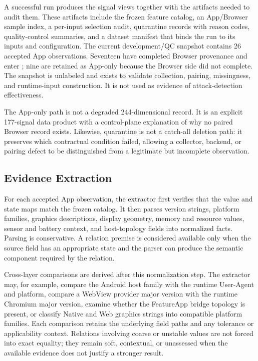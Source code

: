 A successful run produces the signal views together with the artifacts needed to audit them. These artifacts include the frozen feature catalog, an App/Browser sample index, a per-input selection audit, quarantine records with reason codes, quality-control summaries, and a dataset manifest that binds the run to its inputs and configuration. The current development/QC snapshot contains 26 accepted App observations. Seventeen have completed Browser provenance and enter \pairedfp; nine are retained as App-only because the Browser side did not complete. The snapshot is unlabeled and exists to validate collection, pairing, missingness, and runtime-input construction. It is not used as evidence of attack-detection effectiveness.

The App-only path is not a degraded 244-dimensional record. It is an explicit 177-signal data product with a control-plane explanation of why no paired Browser record exists. Likewise, quarantine is not a catch-all deletion path: it preserves which contractual condition failed, allowing a collector, backend, or pairing defect to be distinguished from a legitimate but incomplete observation.

\subsection{Evidence Extraction}

For each accepted App observation, the extractor first verifies that the value and state maps match the frozen catalog. It then parses version strings, platform families, graphics descriptions, display geometry, memory and resource values, sensor and battery context, and host-topology fields into normalized facts. Parsing is conservative. A relation premise is considered available only when the source field has an appropriate state and the parser can produce the semantic component required by the relation.

Cross-layer comparisons are derived after this normalization step. The extractor may, for example, compare the Android host family with the runtime User-Agent and platform, compare a WebView provider major version with the runtime Chromium major version, examine whether the FeatureApp bridge topology is present, or classify Native and Web graphics strings into compatible platform families. Each comparison retains the underlying field paths and any tolerance or applicability context. Relations involving coarse or unstable values are not forced into exact equality; they remain soft, contextual, or unassessed when the available evidence does not justify a stronger result.

